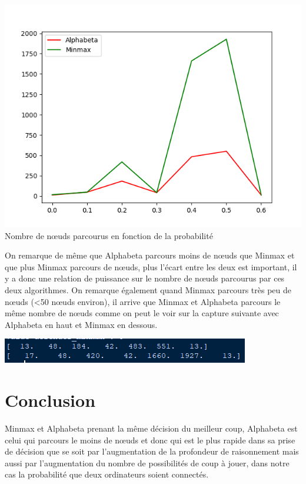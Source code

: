 \documentclass[a4paper,12pt]{article} %
\begin{document}
\begin{center}
\includegraphics[scale=0.5]{images/Figure_6.png}\\
Nombre de nœuds parcourus en fonction de la probabilité
\end{center}

On remarque de même que Alphabeta parcours moins de nœuds que Minmax et que plus Minmax parcours de nœuds, plus l'écart entre les deux est important, il y a donc une relation de puissance sur le nombre de nœuds parcourus par ces deux algorithmes. On remarque également quand Minmax parcours très peu de nœuds (<50 nœuds environ), il arrive que Minmax et Alphabeta parcours le même nombre de nœuds comme on peut le voir sur la capture suivante avec Alphabeta en haut et Minmax en dessous.

\begin{center}
\includegraphics[scale=1]{images/Capture.PNG}
\end{center}

\section*{Conclusion}

Minmax et Alphabeta prenant la même décision du meilleur coup, Alphabeta est celui qui parcours le moins de nœuds et donc qui est le plus rapide dans sa prise de décision que se soit par l'augmentation de la profondeur de raisonnement mais aussi par l'augmentation du nombre de possibilités de coup à jouer, dans notre cas la probabilité que deux ordinateurs soient connectés.
\end{document}
